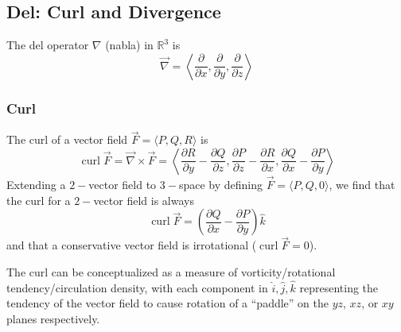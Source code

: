 \documentclass{article}
\DeclareMathOperator{\curl}{curl}
\newcommand{\vect}[1]{\ensuremath{\overrightarrow{#1}}}
\begin{document}
\subsection{Del: Curl and Divergence}
The del operator $\nabla$ (nabla) in $\mathbb{R}^3$  is
$$\vect{\nabla}=\left\langle \frac{\partial}{\partial x}, \frac{\partial}{\partial y}, \frac{\partial}{\partial z}\right\rangle$$

\subsubsection{Curl}
The curl of a vector field $\vect{F} = \langle P,Q,R \rangle$ is
$$\curl \vect{F} = \vect{\nabla}\times\vect{F}=\left\langle\frac{\partial R}{\partial y}-\frac{\partial Q}{\partial z},\frac{\partial P}{\partial z}-\frac{\partial R}{\partial x}, \frac{\partial Q}{\partial x}-\frac{\partial P}{\partial y}\right\rangle$$
Extending a $2-$vector field to $3-$space by defining $\vect{F}=\langle P, Q, 0 \rangle$, we find that the curl for a $2-$vector field is always
$$\curl \vect{F} = \left(\frac{\partial Q}{\partial x}-\frac{\partial P}{\partial y}\right)\hat{k}$$
and that a conservative vector field is irrotational ($\curl \vect{F} = 0$).

The curl can be conceptualized as a measure of vorticity/rotational tendency/circulation density, with each component in $\hat{i}, \hat{j}, \hat{k}$ representing the tendency of the vector field to cause rotation of a ``paddle'' on the $yz$, $xz$, or $xy$ planes respectively.
\end{document}

